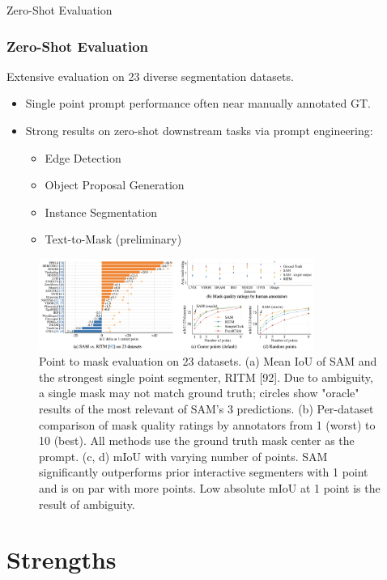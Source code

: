 \documentclass{beamer}
\begin{document}
\begin{frame}{Zero-Shot Evaluation}
    \frametitle{Zero-Shot Evaluation}
    Extensive evaluation on 23 diverse segmentation datasets.
    \begin{itemize}
        \item Single point prompt performance often near manually annotated GT.
        \item Strong results on zero-shot downstream tasks via prompt engineering:
        \vspace{-1em}
        \begin{itemize}
            \item Edge Detection
            \item Object Proposal Generation
            \item Instance Segmentation
            \item Text-to-Mask (preliminary)
        \end{itemize}
    \end{itemize}
    \begin{figure}
        \centering
        \vspace{-6pt}
        \includegraphics[width=0.8\textwidth]{figures/zero_shot_performance.png}
        \caption{Point to mask evaluation on 23 datasets. (a) Mean IoU of SAM and the strongest single point segmenter, RITM [92].
        Due to ambiguity, a single mask may not match ground truth; circles show "oracle" results of the most relevant of SAM's 3
        predictions. (b) Per-dataset comparison of mask quality ratings by annotators from 1 (worst) to 10 (best). All methods use
        the ground truth mask center as the prompt. (c, d) mIoU with varying number of points. SAM signiﬁcantly outperforms prior
        interactive segmenters with 1 point and is on par with more points. Low absolute mIoU at 1 point is the result of ambiguity.}
        \label{fig:zero_shot_performance}
    \end{figure}
\end{frame}

\section{Strengths}
\end{document}
